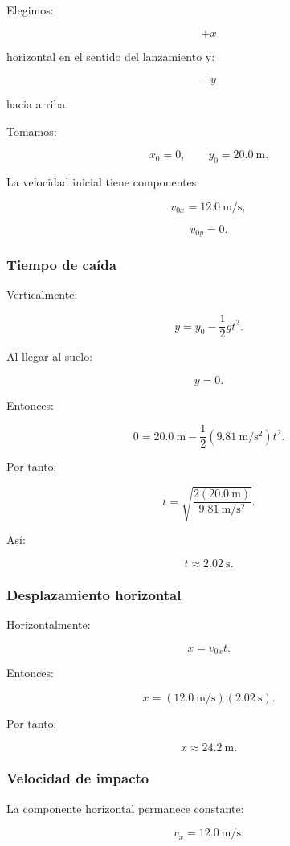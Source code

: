 Elegimos:

\[
+x
\]

horizontal en el sentido del lanzamiento y:

\[
+y
\]

hacia arriba.

Tomamos:

\[
x_0=0,
\qquad
y_0=\SI{20.0}{\meter}.
\]

La velocidad inicial tiene componentes:

\[
v_{0x}=\SI{12.0}{\meter\per\second},
\]

\[
v_{0y}=0.
\]


\subsubsection*{Tiempo de caída}

Verticalmente:

\[
y
=
y_0-\frac{1}{2}gt^2.
\]

Al llegar al suelo:

\[
y=0.
\]

Entonces:

\[
0
=
\SI{20.0}{\meter}
-
\frac{1}{2}
(\SI{9.81}{\meter\per\second\squared})t^2.
\]

Por tanto:

\[
t
=
\sqrt{
\frac{
2(\SI{20.0}{\meter})
}{
\SI{9.81}{\meter\per\second\squared}
}
}.
\]

Así:

\[
\boxed{
t\approx\SI{2.02}{\second}
}.
\]


\subsubsection*{Desplazamiento horizontal}

Horizontalmente:

\[
x=v_{0x}t.
\]

Entonces:

\[
x
=
(\SI{12.0}{\meter\per\second})
(\SI{2.02}{\second}).
\]

Por tanto:

\[
\boxed{
x\approx\SI{24.2}{\meter}
}.
\]


\subsubsection*{Velocidad de impacto}

La componente horizontal permanece constante:

\[
\boxed{
v_x=\SI{12.0}{\meter\per\second}
}.
\]

